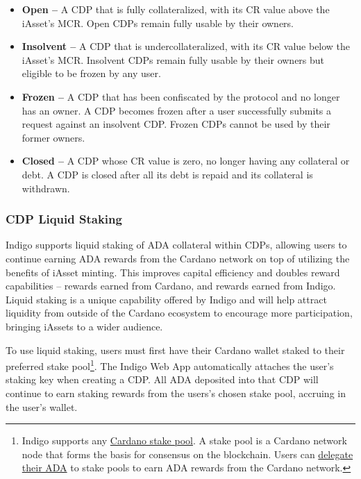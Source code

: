 \documentclass{article}
\begin{document}
\begin{sloppypar}
\begin{itemize}
\item
  \textbf{Open --} A CDP that is fully collateralized, with its CR value
  above the iAsset's MCR. Open CDPs remain fully usable by their owners.
\item
  \textbf{Insolvent --} A CDP that is undercollateralized, with its CR
  value below the iAsset's MCR. Insolvent CDPs remain fully usable by
  their owners but eligible to be frozen by any user.
\item
  \textbf{Frozen --} A CDP that has been confiscated by the protocol and
  no longer has an owner. A CDP becomes frozen after a user successfully
  submits a request against an insolvent CDP. Frozen CDPs cannot be used
  by their former owners.
\item
  \textbf{Closed --} A CDP whose CR value is zero, no longer having any
  collateral or debt. A CDP is closed after all its debt is repaid and
  its collateral is withdrawn.
\end{itemize}

\hypertarget{cdp-liquid-staking}{%
\subsubsection{CDP Liquid Staking}\label{cdp-liquid-staking}}

Indigo supports liquid staking of ADA collateral within CDPs, allowing
users to continue earning ADA rewards from the Cardano network on top of
utilizing the benefits of iAsset minting. This improves capital
efficiency and doubles reward capabilities -- rewards earned from
Cardano, and rewards earned from Indigo. Liquid staking is a unique
capability offered by Indigo and will help attract liquidity from
outside of the Cardano ecosystem to encourage more participation,
bringing iAssets to a wider audience.

To use liquid staking, users must first have their Cardano wallet staked
to their preferred stake pool\footnote{Indigo supports any
  \href{https://cardano.org/stake-pool-delegation/}{Cardano stake pool}.
  A stake pool is a Cardano network node that forms the basis for
  consensus on the blockchain. Users can
  \href{https://www.adastrong.com/staking/}{delegate their ADA} to stake
  pools to earn ADA rewards from the Cardano network.}. The Indigo Web
App automatically attaches the user's staking key when creating a CDP.
All ADA deposited into that CDP will continue to earn staking rewards
from the users's chosen stake pool, accruing in the user's wallet.


\end{sloppypar}
\end{document}
